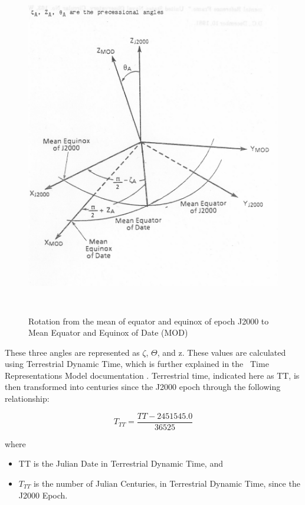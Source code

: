 \begin{figure}[H]
\begin{center}
\includegraphics[height=150mm ,width = 150mm]{fig/fig1.jpg}
\caption{Rotation from the mean of equator and 
equinox of epoch J2000 to Mean Equator and Equinox of Date (MOD) \cite{Bond1}}
\label{fig:prec}
\end{center}
\end{figure}

These three angles are represented as $\zeta$, $\Theta$, and z. These
values are calculated using Terrestrial Dynamic Time, which is further explained
in the \JEODid\ Time Representations Model documentation \cite{dynenv:TIME}. Terrestrial
time, indicated here as TT, is then transformed into centuries since the
J2000 epoch through the following relationship:

\begin{equation}\label{tt_centuries_since}
T_{TT} = \frac{TT - 2451545.0}{36525}
\end{equation}

where

\begin{itemize}
\item TT is the Julian Date in Terrestrial Dynamic Time, and
\item $T_{TT}$ is the number of Julian Centuries, in Terrestrial
Dynamic Time, since the J2000 Epoch.
\end{itemize}

